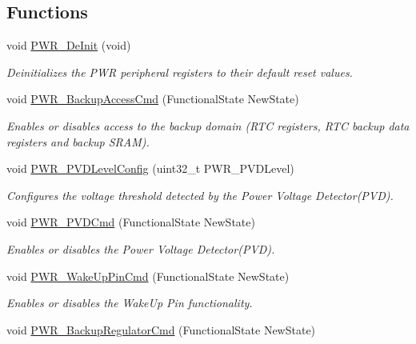 \subsection*{Functions}
\begin{DoxyCompactItemize}
\item 
void \hyperlink{group___p_w_r___exported___constants_gad03a0aac7bc3bc3a9fd012f3769a6990}{P\-W\-R\-\_\-\-De\-Init} (void)
\begin{DoxyCompactList}\small\item\em Deinitializes the P\-W\-R peripheral registers to their default reset values. \end{DoxyCompactList}\item 
void \hyperlink{group___p_w_r___exported___constants_ga0741aea35572b1a75f82b74de12df800}{P\-W\-R\-\_\-\-Backup\-Access\-Cmd} (Functional\-State New\-State)
\begin{DoxyCompactList}\small\item\em Enables or disables access to the backup domain (R\-T\-C registers, R\-T\-C backup data registers and backup S\-R\-A\-M). \end{DoxyCompactList}\item 
void \hyperlink{group___p_w_r___exported___constants_ga237c143ef6aa55abb8049fa7bf24ab8f}{P\-W\-R\-\_\-\-P\-V\-D\-Level\-Config} (uint32\-\_\-t P\-W\-R\-\_\-\-P\-V\-D\-Level)
\begin{DoxyCompactList}\small\item\em Configures the voltage threshold detected by the Power Voltage Detector(\-P\-V\-D). \end{DoxyCompactList}\item 
void \hyperlink{group___p_w_r___exported___constants_ga42cad476b816e0a33594a933b3ed1acd}{P\-W\-R\-\_\-\-P\-V\-D\-Cmd} (Functional\-State New\-State)
\begin{DoxyCompactList}\small\item\em Enables or disables the Power Voltage Detector(\-P\-V\-D). \end{DoxyCompactList}\item 
void \hyperlink{group___p_w_r___exported___constants_gae5fd6f9336ef8c60d5483651cb0d1a00}{P\-W\-R\-\_\-\-Wake\-Up\-Pin\-Cmd} (Functional\-State New\-State)
\begin{DoxyCompactList}\small\item\em Enables or disables the Wake\-Up Pin functionality. \end{DoxyCompactList}\item 
void \hyperlink{group___p_w_r___exported___constants_ga83a4d6c5b048f2dab18e8fb04f5368d7}{P\-W\-R\-\_\-\-Backup\-Regulator\-Cmd} (Functional\-State New\-State)

\end{DoxyCompactItemize}
